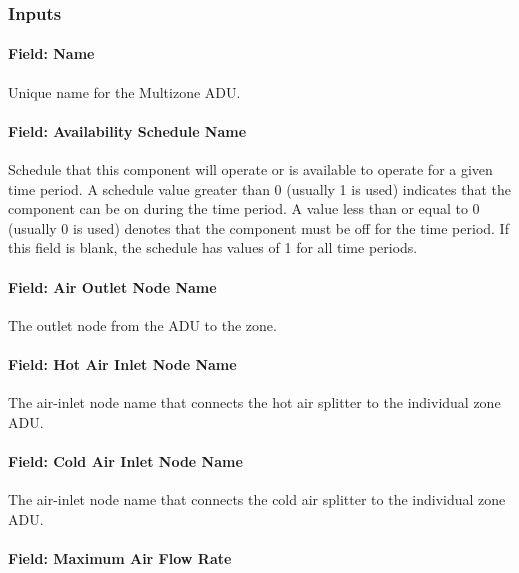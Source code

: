 \subsubsection{Inputs}\label{inputs-14-000}

\paragraph{Field: Name}\label{field-name-14}

Unique name for the Multizone ADU.

\paragraph{Field: Availability Schedule Name}\label{field-availability-schedule-name-11}

Schedule that this component will operate or is available to operate for a given time period. A schedule value greater than 0 (usually 1 is used) indicates that the component can be on during the time period. A value less than or equal to 0 (usually 0 is used) denotes that the component must be off for the time period. If this field is blank, the schedule has values of 1 for all time periods.

\paragraph{Field: Air Outlet Node Name}\label{field-air-outlet-node-name-7}

The outlet node from the ADU to the zone.

\paragraph{Field: Hot Air Inlet Node Name}\label{field-hot-air-inlet-node-name}

The air-inlet node name that connects the hot air splitter to the individual zone ADU.

\paragraph{Field: Cold Air Inlet Node Name}\label{field-cold-air-inlet-node-name}

The air-inlet node name that connects the cold air splitter to the individual zone ADU.

\paragraph{Field: Maximum Air Flow Rate}\label{field-maximum-air-flow-rate-7}

